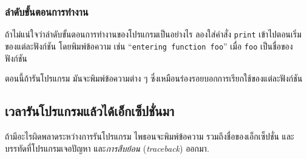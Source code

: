 \subsubsection{ลำดับขั้นตอนการทำงาน}



ถ้าไม่แน่ใจว่าลำดับขั้นตอนการทำงานของโปรแกรมเป็นอย่างไร
ลองใส่คำสั่ง \texttt{print} เข้าไปตอนเริ่มของแต่ละฟังก์ชัน โดยพิมพ์ข้อความ เช่น
``\texttt{entering function foo}'' เมื่อ \texttt{foo} เป็นชื่อของฟังก์ชัน

ตอนนี้ถ้ารันโปรแกรม
มันจะพิมพ์ข้อความต่าง ๆ ซึ่งเหมือนร่องรอยบอกการเรียกใช้ของแต่ละฟังก์ชัน

\subsection{เวลารันโปรแกรมแล้วได้เอ็กเซ็ปชั่นมา}


ถ้ามีอะไรผิดพลาดระหว่างการรันโปรแกรม
ไพธอนจะพิมพ์ข้อความ รวมถึงชื่อของเอ็กเซ็ปชั่น
และบรรทัดที่โปรแกรมเจอปัญหา และ\textit{การสืบย้อน} (\textit{traceback})
ออกมา.



